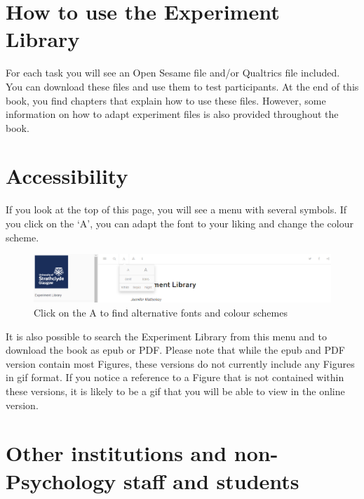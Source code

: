 \documentclass[
]{book}
\begin{document}
\hypertarget{how-to-use-the-experiment-library}{%
\section{How to use the Experiment Library}\label{how-to-use-the-experiment-library}}

For each task you will see an Open Sesame file and/or Qualtrics file included. You can download these files and use them to test participants. At the end of this book, you find chapters that explain how to use these files. However, some information on how to adapt experiment files is also provided throughout the book.

\hypertarget{accessibility}{%
\section{Accessibility}\label{accessibility}}

If you look at the top of this page, you will see a menu with several symbols. If you click on the `A', you can adapt the font to your liking and change the colour scheme.

\begin{figure}

{\centering \includegraphics[width=0.95\linewidth]{images/accessibility} 

}

\caption{Click on the A to find alternative fonts and colour schemes}\label{fig:Figure0-1}
\end{figure}

It is also possible to search the Experiment Library from this menu and to download the book as epub or PDF. Please note that while the epub and PDF version contain most Figures, these versions do not currently include any Figures in gif format. If you notice a reference to a Figure that is not contained within these versions, it is likely to be a gif that you will be able to view in the online version.

\hypertarget{other-institutions-and-non-psychology-staff-and-students}{%
\section{Other institutions and non-Psychology staff and students}\label{other-institutions-and-non-psychology-staff-and-students}}
\end{document}
